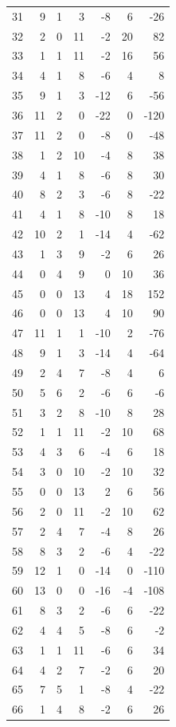 \documentclass[11pt]{article}
\begin{document}
\begin{center}
\begin{longtable}{r r r r r r r}
31 & 9 & 1 & 3 & -8 & 6 & -26\\
32 & 2 & 0 & 11 & -2 & 20 & 82\\
33 & 1 & 1 & 11 & -2 & 16 & 56\\
34 & 4 & 1 & 8 & -6 & 4 & 8\\
35 & 9 & 1 & 3 & -12 & 6 & -56\\
36 & 11 & 2 & 0 & -22 & 0 & -120\\
37 & 11 & 2 & 0 & -8 & 0 & -48\\
38 & 1 & 2 & 10 & -4 & 8 & 38\\
39 & 4 & 1 & 8 & -6 & 8 & 30\\
40 & 8 & 2 & 3 & -6 & 8 & -22\\
41 & 4 & 1 & 8 & -10 & 8 & 18\\
42 & 10 & 2 & 1 & -14 & 4 & -62\\
43 & 1 & 3 & 9 & -2 & 6 & 26\\
44 & 0 & 4 & 9 & 0 & 10 & 36\\
45 & 0 & 0 & 13 & 4 & 18 & 152\\
46 & 0 & 0 & 13 & 4 & 10 & 90\\
47 & 11 & 1 & 1 & -10 & 2 & -76\\
48 & 9 & 1 & 3 & -14 & 4 & -64\\
49 & 2 & 4 & 7 & -8 & 4 & 6\\
50 & 5 & 6 & 2 & -6 & 6 & -6\\
51 & 3 & 2 & 8 & -10 & 8 & 28\\
52 & 1 & 1 & 11 & -2 & 10 & 68\\
53 & 4 & 3 & 6 & -4 & 6 & 18\\
54 & 3 & 0 & 10 & -2 & 10 & 32\\
55 & 0 & 0 & 13 & 2 & 6 & 56\\
56 & 2 & 0 & 11 & -2 & 10 & 62\\
57 & 2 & 4 & 7 & -4 & 8 & 26\\
58 & 8 & 3 & 2 & -6 & 4 & -22\\
59 & 12 & 1 & 0 & -14 & 0 & -110\\
60 & 13 & 0 & 0 & -16 & -4 & -108\\
61 & 8 & 3 & 2 & -6 & 6 & -22\\
62 & 4 & 4 & 5 & -8 & 6 & -2\\
63 & 1 & 1 & 11 & -6 & 6 & 34\\
64 & 4 & 2 & 7 & -2 & 6 & 20\\
65 & 7 & 5 & 1 & -8 & 4 & -22\\
66 & 1 & 4 & 8 & -2 & 6 & 26\\

\end{longtable}
\end{center}
\end{document}
